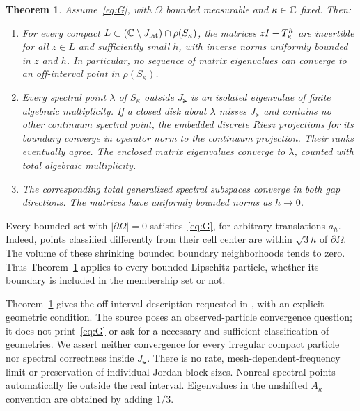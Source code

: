 \documentclass[11pt]{article}
\newtheorem{theorem}{Theorem}
\theoremstyle{remark}\newtheorem{remark}[theorem]{Remark}
\begin{document}
\begin{theorem}\label{thm:main}
Assume~\eqref{eq:G}, with $\Omega$ bounded measurable and $\kappa\in\mathbb C$ fixed. Then:
\begin{enumerate}
\item For every compact $L\subset(\mathbb C\setminus J_{\mathrm{lat}})\cap\rho(S_\kappa)$, the matrices $zI-T_\kappa^h$ are invertible for all $z\in L$ and sufficiently small $h$, with inverse norms uniformly bounded in $z$ and $h$. In particular, no sequence of matrix eigenvalues can converge to an off-interval point in $\rho(S_\kappa)$.
\item Every spectral point $\lambda$ of $S_\kappa$ outside $J_\lat$ is an isolated eigenvalue of finite algebraic multiplicity. If a closed disk about $\lambda$ misses $J_\lat$ and contains no other continuum spectral point, the embedded discrete Riesz projections for its boundary converge in operator norm to the continuum projection. Their ranks eventually agree. The enclosed matrix eigenvalues converge to $\lambda$, counted with total algebraic multiplicity.
\item The corresponding total generalized spectral subspaces converge in both gap directions. The matrices have uniformly bounded norms as $h\to0$.
\end{enumerate}
\end{theorem}

Every bounded set with $|\partial\Omega|=0$ satisfies~\eqref{eq:G}, for arbitrary translations $a_h$. Indeed, points classified differently from their cell center are within $\sqrt3h$ of $\partial\Omega$. The volume of these shrinking bounded boundary neighborhoods tends to zero. Thus Theorem~\ref{thm:main} applies to every bounded Lipschitz particle, whether its boundary is included in the membership set or not.

Theorem~\ref{thm:main} gives the off-interval description requested in \cite[\S4, p.~2582]{OWR}, with an explicit geometric condition. The source poses an observed-particle convergence question; it does not print~\eqref{eq:G} or ask for a necessary-and-sufficient classification of geometries. We assert neither convergence for every irregular compact particle nor spectral correctness inside $J_\lat$. There is no rate, mesh-dependent-frequency limit or preservation of individual Jordan block sizes. Nonreal spectral points automatically lie outside the real interval. Eigenvalues in the unshifted $A_\kappa$ convention are obtained by adding $1/3$.
\end{document}
